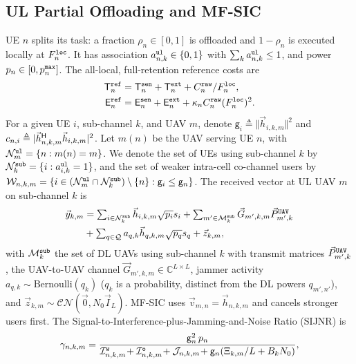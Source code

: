 \documentclass[journal]{IEEEtran}
\begin{document}
\subsection{UL Partial Offloading and MF-SIC}
\label{sec:ul}
UE $n$ splits its task: a fraction $\rho_n\in[0,1]$ is offloaded and $1-\rho_n$ is executed locally at $F_n^{\tt loc}$. It has association $a_{n,k}^{\tt ul}\in\{0,1\}$ with $\sum_k a_{n,k}^{\tt ul}\le 1$, and power $p_n\in[0,p_n^{\tt max}]$. The all-local, full-retention reference costs are
\begin{align}
\mathsf{T}_n^{\tt ref}&=\mathsf{T}_n^{\tt sen}+\mathsf{T}_n^{\tt ext}+C_n^{\tt raw}/F_n^{\tt loc},
\label{eq:ref}\\
\mathsf{E}_n^{\tt ref}&=\mathsf{E}_n^{\tt sen}+\mathsf{E}_n^{\tt ext}+\kappa_n C_n^{\tt raw}(F_n^{\tt loc})^2 .
\nonumber
\end{align}
{\color{blue}For a given UE $i$, sub-channel $k$, and UAV $m$, denote $\mathsf{g}_i\triangleq\Vert\vec{h}_{i,k,m}\Vert^2$ and $c_{n,i}\triangleq|\vec{h}_{n,k,m}^{\sf H}\vec{h}_{i,k,m}|^2$. Let $m(n)$ be the UAV serving UE $n$, with $\mathcal{N}_m^{\tt ul}=\{n:m(n)=m\}$. We denote the set of UEs using sub-channel $k$ by $\mathcal{N}_k^{\tt sub}=\{i:a_{i,k}^{\tt ul}=1\}$, and the set of weaker intra-cell co-channel users by $\mathcal{W}_{n,k,m}=\{i\in(\mathcal{N}_m^{\tt ul}\cap\mathcal{N}_k^{\tt sub})\setminus\{n\}:\mathsf{g}_i\le\mathsf{g}_n\}$.}
The received vector at UL UAV $m$ on sub-channel $k$ is
\begin{equation}
\begin{aligned}
\textstyle\vec{y}_{k,m}&=\textstyle\sum_{i\in\mathcal{N}_k^{\tt sub}}\vec{h}_{i,k,m}\sqrt{p_i}s_i+\sum_{m'\in\mathcal{M}_k^{\tt sub}}\vec{G}_{m',k,m}\vec{P}_{m',k}^{\tt UAV}\\
&\textstyle+\sum_{q\in\mathcal{Q}}a_{q,k}\vec{h}_{q,k,m}\sqrt{p_q}s_q+\vec{z}_{k,m},
\end{aligned}
\label{eq:ul_y}
\end{equation}
{\color{blue}with $\mathcal{M}_k^{\tt sub}$ the set of DL UAVs using sub-channel $k$ with transmit matrices $\vec{P}_{m',k}^{\tt UAV}$}, the UAV-to-UAV channel $\vec{G}_{m',k,m}\in\mathbb{C}^{L\times L}$, jammer activity $a_{q,k}\sim\mathrm{Bernoulli}(q_k)$ ($q_k$ is a probability, distinct from the DL powers $q_{m',n'}$), and $\vec{z}_{k,m}\sim\mathcal{CN}(\vec{0},N_0\vec{I}_L)$. MF-SIC uses $\vec{v}_{m,n}=\vec{h}_{n,k,m}$ and cancels stronger users first. The Signal-to-Interference-plus-Jamming-and-Noise Ratio (SIJNR) is
\begin{equation}
\gamma_{n,k,m}
=\frac{\mathsf{g}_n^2\, p_n}
{\mathcal{I}_{n,k,m}^{\tt w}\!+\mathcal{I}_{n,k,m}^{\tt o}\!+\mathcal{J}_{n,k,m}
\!+\mathsf{g}_n(\Xi_{k,m}/L+B_kN_0)},
\label{eq:ul_sijnr}
\end{equation}
\end{document}
